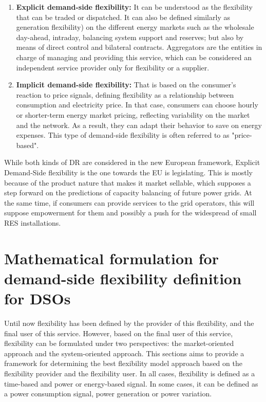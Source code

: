 \begin{enumerate}
\item \textbf{Explicit demand-side flexibility:} It can be understood as the flexibility that can be traded or dispatched. It can also be defined similarly as generation flexibility) on the different energy markets such as the wholesale day-ahead, intraday, balancing system support and reserves; but also by means of direct control and bilateral contracts. Aggregators are the entities in charge of managing and providing this service, which can be considered an independent service provider only for flexibility or a supplier.
\item \textbf{Implicit demand-side flexibility:} That is based on the consumer's reaction to price signals, defining flexibility as a relationship between consumption and electricity price. In that case, consumers can choose hourly or shorter-term energy market pricing, reflecting variability on the market and the network. As a result, they can adapt their behavior to save on energy expenses. This type of demand-side flexibility is often referred to as "price-based".
\end{enumerate}

While both kinds of DR are considered in the new European framework, Explicit Demand-Side flexibility is the one towards the EU is legislating. This is mostly because of the product nature that makes it market sellable, which supposes a step forward on the predictions of capacity balancing of future power grids. At the same time, if consumers can provide services to the grid operators, this will suppose empowerment for them and possibly a push for the widespread of small RES installations. 

\section{Mathematical formulation for demand-side flexibility definition for DSOs}

Until now flexibility has been defined by the provider of this flexibility, and the final user of this service. However, based on the final user of this service, flexibility can be formulated under two perspectives: the market-oriented approach and the system-oriented approach. This sections aims to provide a framework for determining the best flexibility model approach based on the flexibility provider and the flexibility user. In all cases, flexibility is defined as a time-based and power or energy-based signal. In some cases, it can be defined as a power consumption signal, power generation or power variation. 

